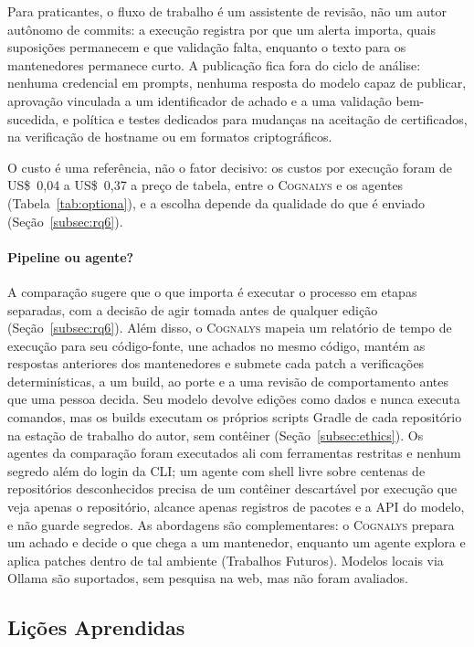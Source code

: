 \documentclass[conference]{IEEEtran}
\newcommand{\system}{\textsc{Cognalys}}
\begin{document}
Para praticantes, o fluxo de trabalho é um assistente de revisão, não um autor
autônomo de commits: a execução registra por que um alerta importa, quais suposições permanecem
e que validação falta, enquanto o texto para os mantenedores permanece curto.
A publicação fica fora do ciclo de análise: nenhuma credencial em prompts, nenhuma
resposta do modelo capaz de publicar, aprovação vinculada a um identificador de achado e a uma
validação bem-sucedida, e política e testes dedicados para mudanças na aceitação de
certificados, na verificação de hostname ou em formatos criptográficos.

O custo é uma referência, não o fator decisivo: os custos por execução foram de US\$~0,04 a
US\$~0,37 a preço de tabela, entre o \system{} e os agentes
(Tabela~\ref{tab:optiona}), e a escolha depende da qualidade do que é enviado
(Seção~\ref{subsec:rq6}).

\paragraph{Pipeline ou agente?} A comparação sugere que o que importa é
executar o processo em etapas separadas, com a decisão de agir tomada antes de
qualquer edição (Seção~\ref{subsec:rq6}). Além disso, o \system{} mapeia um
relatório de tempo de execução para seu código-fonte, une
achados no mesmo código, mantém as respostas anteriores dos mantenedores e submete cada
patch a verificações determinísticas, a um build, ao porte e a uma revisão de comportamento
antes que uma pessoa decida. Seu modelo devolve edições como dados e nunca executa
comandos, mas os builds executam os próprios scripts Gradle de cada repositório na
estação de trabalho do autor, sem contêiner (Seção~\ref{subsec:ethics}). Os
agentes da comparação foram executados ali com ferramentas restritas e nenhum segredo além do
login da CLI; um agente com shell livre sobre centenas de repositórios desconhecidos precisa de um
contêiner descartável por execução que veja apenas o repositório, alcance apenas
registros de pacotes e a API do modelo, e não guarde segredos. As abordagens
são complementares: o \system{} prepara um achado e decide o que chega a um
mantenedor, enquanto um agente explora e aplica patches dentro de tal ambiente
(Trabalhos Futuros). Modelos locais via Ollama são suportados, sem pesquisa
na web, mas não foram avaliados.

\subsection{Lições Aprendidas}
\label{sec:lessons}
\end{document}
